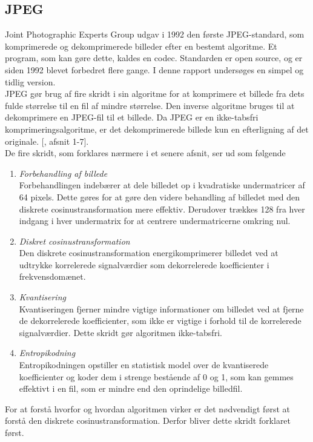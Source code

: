 \subsection{JPEG}
Joint Photographic Experts Group udgav i 1992 den første JPEG-standard, som komprimerede og dekomprimerede billeder efter en bestemt algoritme. Et program, som kan gøre dette, kaldes en codec. Standarden er open source, og er siden 1992 blevet forbedret flere gange. I denne rapport undersøges en simpel og tidlig version.\\
JPEG gør brug af fire skridt i sin algoritme for at komprimere et billede fra dets fulde størrelse til en fil af mindre størrelse. Den inverse algoritme bruges til at dekomprimere en JPEG-fil til et billede. Da JPEG er en ikke-tabsfri komprimeringsalgoritme, er det dekomprimerede billede kun en efterligning af det originale. [\citet{whydomath_basic}, afsnit 1-7].\\
De fire skridt, som forklares nærmere i et senere afsnit, ser ud som følgende
\begin{enumerate}
\item \textit{Forbehandling af billede}\\
	Forbehandlingen indebærer at dele billedet op i kvadratiske undermatricer af 64 pixels. Dette gøres for at gøre den videre behandling af billedet med den diskrete cosinustransformation mere effektiv. Derudover trækkes 128 fra hver indgang i hver undermatrix for at centrere undermatricerne omkring nul.
\item \textit{Diskret cosinustransformation}\\
	Den diskrete cosinustransformation energikomprimerer billedet ved at udtrykke korrelerede signalværdier som dekorrelerede koefficienter i frekvensdomænet.
\item \textit{Kvantisering}\\
	Kvantiseringen fjerner mindre vigtige informationer om billedet ved at fjerne de dekorrelerede koefficienter, som ikke er vigtige i forhold til de korrelerede signalværdier. Dette skridt gør algoritmen ikke-tabsfri.
\item \textit{Entropikodning}\\
	Entropikodningen opstiller en statistisk model over de kvantiserede koefficienter og koder dem i strenge bestående af 0 og 1, som kan gemmes effektivt i en fil, som er mindre end den oprindelige billedfil.
\end{enumerate}
For at forstå hvorfor og hvordan algoritmen virker er det nødvendigt først at forstå den diskrete cosinustransformation. Derfor bliver dette skridt forklaret først.
